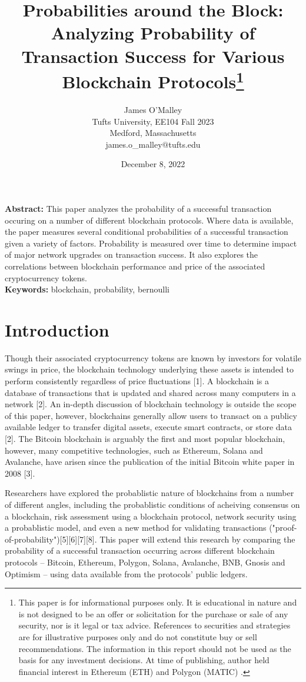 \documentclass[12pt]{article}
\author{James O'Malley\\
Tufts University, EE104 Fall 2023\\
Medford, Massachusetts\\
james.o\_malley$@$tufts.edu}
\title{Probabilities around the Block: Analyzing Probability of Transaction Success for Various Blockchain Protocols\footnote{This paper is for informational purposes only. It is educational in nature and is not designed to be an offer or solicitation for the purchase or sale of any security, nor is it legal or tax advice. References to securities and strategies are for illustrative purposes only and do not constitute buy or sell recommendations. The information in this report should not be used as the basis for any investment decisions. At time of publishing, author held financial interest in Ethereum (ETH) and Polygon (MATIC) .}}
\date{December 8, 2022}
\begin{document}
\maketitle

\textbf{Abstract:} This paper analyzes the probability of a successful transaction occuring on a number of different blockchain protocols. Where data is available, the paper measures several conditional probabilities of a successful transaction given a variety of factors. Probability is measured over time to determine impact of major network upgrades on transaction success. It also explores the correlations between blockchain performance and price of the associated cryptocurrency tokens.\\

\textbf{Keywords:} blockchain, probability, bernoulli

\pagebreak

\section{Introduction}

Though their associated cryptocurrency tokens are known by investors for volatile swings in price, the blockchain technology underlying these assets is intended to perform consistently regardless of price fluctuations [1]. A blockchain is a database of transactions that is updated and shared across many computers in a network [2]. 
An in-depth discussion of blockchain technology is outside the scope of this paper, however, blockchains generally allow users to transact on a publicy available ledger to transfer digital assets, execute smart contracts, or store data [2]. The Bitcoin blockchain is arguably the first and most popular blockchain, however, many competitive technologies, such as Ethereum, Solana and Avalanche, have arisen since the publication of the initial Bitcoin white paper in 2008 [3].   

Researchers have explored the probablistic nature of blockchains from a number of different angles, including the probablistic conditions of acheiving consensus on a blockchain, risk assessment using a blockchain protocol, network security using a probablistic model, and even a new method for validating transactions ("proof-of-probability")[5][6][7][8]. This paper will extend this research by comparing the probability of a successful transaction occurring across different blockchain protocols -- Bitcoin, Ethereum, Polygon, Solana, Avalanche, BNB, Gnosis and Optimism -- using data available from the protocols' public ledgers. 
\end{document}
